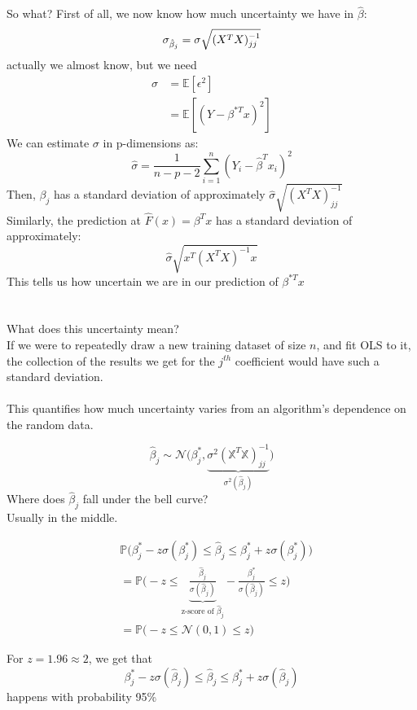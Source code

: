 \documentclass[a4paper]{article}
\newcommand{\bhj}{\widehat{\beta}_j}
\newcommand{\bsj}{\beta^*_j}
\begin{document}
So what? First of all, we now know how much uncertainty we have in $\hat{\beta}$:
\[
\sigma_{\hat{\beta}_j}=\sigma \sqrt{(X^TX)^{-1}_{jj}}\\
\]
actually we almost know, but we need 
\begin{align*}
\sigma&=\mathbb{E}[\epsilon^2]\\
&=\mathbb{E}[(Y-\beta^{*T}x)^2]
\end{align*}
\bigskip
We can estimate $\sigma$ in p-dimensions as:
\[
\hat{\sigma} = \frac{1}{n-p-2} \sum^n_{i=1}(Y_i-\hat{\beta}^T x_i)^2
\]
Then, $\beta_j$ has a standard deviation of approximately $\hat{\sigma}\sqrt{(X^TX)^{-1}_{jj}}$\\
Similarly, the prediction at $\hat{F}(x) = \beta^T x$ has a standard deviation  of approximately:
\[
\hat{\sigma}\sqrt{x^T(X^TX)^{-1}x}
\]
This tells us how uncertain we are in our prediction of $\beta^{*T}x$

\section*{}
What does this uncertainty mean? \\
If we were to repeatedly draw a new training dataset of size $n$, and fit OLS to it, the collection of the results we get for the $j^{th}$ coefficient would have such a standard deviation. \\
\\
This quantifies how much uncertainty varies from an algorithm's dependence on the random data.

\begin{equation*}
\widehat{\beta}_j\sim\mathcal{N}\bigg(\beta^*_j,\underbrace{\sigma^2(\mathbb{X}^T\mathbb{X})^{-1}_{jj}}_\text{$\sigma^2(\widehat{\beta}_j)$}\bigg)
\end{equation*}
Where does $\bhj$ fall under the bell curve?\\
Usually in the middle.

\begin{align*}
&\mathbb{P}\bigg(\bsj-z\sigma(\bsj)\leq\bhj\leq\bsj+z\sigma(\bsj)\bigg)\\
&=\mathbb{P}\bigg(-z\leq\underbrace{\frac{\bhj}{\sigma(\bhj)}}_\text{z-score of $\bhj$}-\frac{\bsj}{\sigma(\bhj)}\leq z\bigg)\\&=\mathbb{P}\bigg(-z\leq\mathcal{N}(0,1)\leq z\bigg)
\end{align*}

For $z=1.96\approx 2$, we get that
$$\bsj-z\sigma(\bhj)\leq \bhj	\leq	\bsj+z\sigma(\bhj)$$
happens with probability 95\%\\
\end{document}
